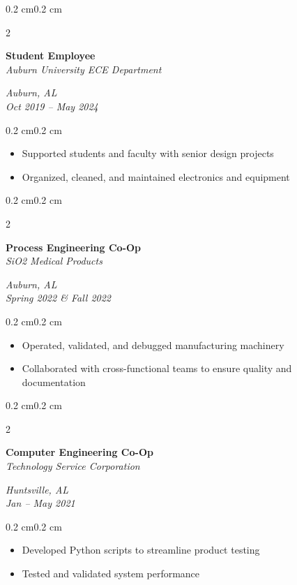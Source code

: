 \documentclass[10pt, letterpaper]{article}
\newenvironment{highlights}{
    \begin{itemize}[topsep=0.10 cm,parsep=0.10 cm,partopsep=0pt,itemsep=0pt,leftmargin=0.4 cm + 10pt]
}{
    \end{itemize}
}
\newenvironment{onecolentry}{
    \begin{adjustwidth}{0.2 cm}{0.2 cm}
}{
    \end{adjustwidth}
}
\newenvironment{twocolentry}[2][]{
    \onecolentry
    \def\secondColumn{#2}
    \setcolumnwidth{\fill, 4.5 cm}
    \begin{paracol}{2}
}{
    \switchcolumn \raggedleft \secondColumn
    \end{paracol}
    \endonecolentry
}
\begin{document}
        \begin{twocolentry}{\textit{Auburn, AL} \\ \textit{Oct 2019 – May 2024}}
            \textbf{Student Employee} \\
            \textit{Auburn University ECE Department}
        \end{twocolentry}
        \vspace{0.10 cm}
        \begin{onecolentry}
            \begin{highlights}
                \item Supported students and faculty with senior design projects
                \item Organized, cleaned, and maintained electronics and equipment
            \end{highlights}
        \end{onecolentry}

        \vspace{0.2 cm}

        \begin{twocolentry}{\textit{Auburn, AL} \\ \textit{Spring 2022 \& Fall 2022}}
            \textbf{Process Engineering Co-Op} \\
            \textit{SiO2 Medical Products}
        \end{twocolentry}
        \vspace{0.10 cm}
        \begin{onecolentry}
            \begin{highlights}
                \item Operated, validated, and debugged manufacturing machinery
                \item Collaborated with cross-functional teams to ensure quality and documentation
            \end{highlights}
        \end{onecolentry}

        \vspace{0.2 cm}

        \begin{twocolentry}{\textit{Huntsville, AL} \\ \textit{Jan – May 2021}}
            \textbf{Computer Engineering Co-Op} \\
            \textit{Technology Service Corporation}
        \end{twocolentry}
        \vspace{0.10 cm}
        \begin{onecolentry}
            \begin{highlights}
                \item Developed Python scripts to streamline product testing
                \item Tested and validated system performance
            \end{highlights}
        \end{onecolentry}
\end{document}
